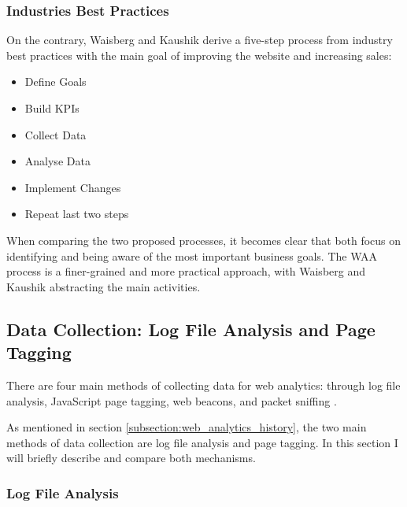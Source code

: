 \subsubsection{Industries Best Practices} %

On the contrary, Waisberg and Kaushik \cite{2009Waisberg} derive a five-step process from industry best practices with the main goal of improving the website and increasing sales: 

\begin{itemize}
\item Define Goals
\item Build KPIs
\item Collect Data
\item Analyse Data
\item Implement Changes
\item Repeat last two steps
\end{itemize}




When comparing the two proposed processes, it becomes clear that both focus on identifying and being aware of the most important business goals.
The WAA process is a finer-grained and more practical approach, with Waisberg and Kaushik abstracting the main activities.




\subsection{Data Collection: Log File Analysis and Page Tagging} %
\label{subsection:web_analytics_logfile_pagetagging}

There are four main methods of collecting data for web analytics: through log file analysis, JavaScript page tagging, web beacons, and packet sniffing \cite{2009Waisberg}.

As mentioned in section \ref{subsection:web_analytics_history}, the two main methods of data collection are log file analysis and page tagging.
In this section I will briefly describe and compare both mechanisms.


\subsubsection{Log File Analysis} %
\label{subsubsection:log_file}

